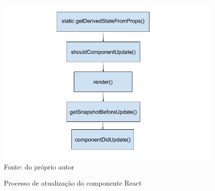 \begin{figure}[H]
\centering
\caption{Processo de atualização do componente React}
\includegraphics[scale=0.2]{figuras/atualizacao.png}
\label{atualizacao}
\\
\small{Fonte: do próprio autor}
\end{figure}
